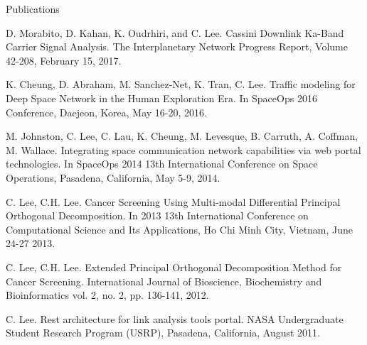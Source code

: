 \documentclass{resume} %
\begin{document}
\begin{rSection}{Publications}
\item D. Morabito, D. Kahan, K. Oudrhiri, and C. Lee. Cassini Downlink Ka-Band Carrier Signal Analysis. The Interplanetary Network Progress Report, Volume 42-208, February 15, 2017. 


\item K. Cheung, D. Abraham, M. Sanchez-Net, K. Tran, C. Lee. Traffic modeling for Deep Space Network in the Human Exploration Era. In SpaceOps 2016 Conference, Daejeon, Korea, May 16-20, 2016.


\item M. Johnston, C. Lee, C. Lau, K. Cheung, M. Levesque, B. Carruth, A. Coffman, M. Wallace. Integrating space communication network capabilities via web portal technologies. In SpaceOps 2014 13th International Conference on Space Operations, Pasadena, California, May 5-9, 2014. 


\item C. Lee, C.H. Lee. Cancer Screening Using Multi-modal Differential Principal Orthogonal Decomposition. In 2013 13th International Conference on Computational Science and Its Applications, Ho Chi Minh City, Vietnam, June 24-27 2013.

\item C. Lee, C.H. Lee. Extended Principal Orthogonal Decomposition Method for Cancer Screening. International Journal of Bioscience, Biochemistry and Bioinformatics vol. 2, no. 2, pp. 136-141, 2012.

\item C. Lee. Rest architecture for link analysis tools portal. NASA Undergraduate Student Research Program (USRP), Pasadena, California, August 2011. 




\end{rSection}






\end{document}
